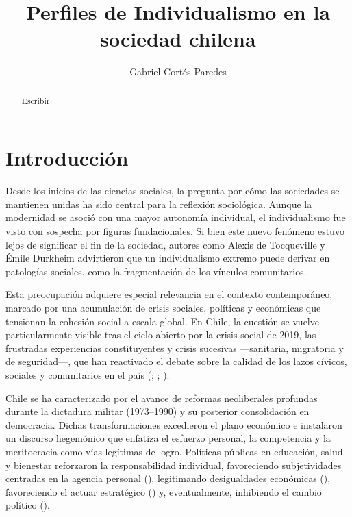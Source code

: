 \documentclass[
  letterpaper,
  DIV=11,
  numbers=noendperiod]{scrartcl}
\title{Perfiles de Individualismo en la sociedad chilena}
\author{Gabriel Cortés Paredes}
\date{}
\begin{document}
\maketitle
\begin{abstract}
Escribir
\end{abstract}


\section{Introducción}\label{introducciuxf3n}

Desde los inicios de las ciencias sociales, la pregunta por cómo las
sociedades se mantienen unidas ha sido central para la reflexión
sociológica. Aunque la modernidad se asoció con una mayor autonomía
individual, el individualismo fue visto con sospecha por figuras
fundacionales. Si bien este nuevo fenómeno estuvo lejos de significar el
fin de la sociedad, autores como Alexis de Tocqueville y Émile Durkheim
advirtieron que un individualismo extremo puede derivar en patologías
sociales, como la fragmentación de los vínculos comunitarios.

Esta preocupación adquiere especial relevancia en el contexto
contemporáneo, marcado por una acumulación de crisis sociales, políticas
y económicas que tensionan la cohesión social a escala global. En Chile,
la cuestión se vuelve particularmente visible tras el ciclo abierto por
la crisis social de 2019, las frustradas experiencias constituyentes y
crisis sucesivas ---sanitaria, migratoria y de seguridad---, que han
reactivado el debate sobre la calidad de los lazos cívicos, sociales y
comunitarios en el país (;
; ).

Chile se ha caracterizado por el avance de reformas neoliberales
profundas durante la dictadura militar (1973--1990) y su posterior
consolidación en democracia. Dichas transformaciones excedieron el plano
económico e instalaron un discurso hegemónico que enfatiza el esfuerzo
personal, la competencia y la meritocracia como vías legítimas de logro.
Políticas públicas en educación, salud y bienestar reforzaron la
responsabilidad individual, favoreciendo subjetividades centradas en la
agencia personal (),
legitimando desigualdades económicas
(),
favoreciendo el actuar estratégico () y, eventualmente, inhibiendo el cambio político
().
\end{document}
